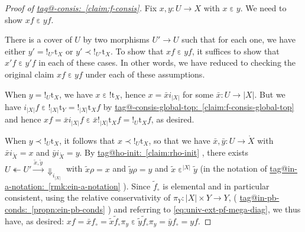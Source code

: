 \documentclass{amsart}
\makeatletter
\newcommand\abs[2][]{#1\lvert{#2}#1\rvert}
\newcommand\Dwn{{\Downarrow}}
\newcommand\ein{\mathrel{\varepsilon}}
\newcommand\oot{\twoheadleftarrow}
\newcommand\oring[1]{\mathring{#1}}
\newcommand\rt{\mathrm{t}}
\newcommand\tox[2][]{\xrightarrow[#1]{#2}}
\newcommand\unex{{!}}
\newcommand\tagword[1]{\csname tag@#1\endcsname}
\def\label@tag#1:#2\@nil{#1}
\newcommand\labeltag[1]{\label@tag#1:\@nil}
\newcommand\jref[1]{%
  \texorpdfstring%
    {\hyperref[#1]{\tagword{\labeltag{#1}}~\ref*{#1}}}%
    {\tagword{\labeltag{#1}}~\ref*{#1}}%
}
\theoremstyle{definition}
\theoremstyle{remark}
\theoremstyle{plainwithref}
\makeatother
\begin{document}
\begin{proof}[Proof of \jref{claim:f-consis}] \label{proof:f-consis}
  Fix \( x,y \colon U \to X \) with \( x \ein y \).
  We need to show \( x f \ein y f \).

  There is a cover of \( U \) by two morphisms \( U' \to U \) such that for each one, we have either \( y' = \unex_{U'} \rt_X \) or \( y' \prec \unex_{U'} \rt_X \).
  To show that \( x f \ein y f \), it suffices to show that \( x' f \ein y' f \) in each of these cases.
  In other words, we have reduced to checking the original claim \( x f \ein y f \) under each of these assumptions.

  When \( y = \unex_U \rt_X \), we have \( x \ein \unex \rt_X \), hence \( x = \bar x i_{\abs X} \) for some \( \bar x \colon U \to \abs X \).
  But we have \( i_{\abs X} f \ein \unex_{\abs X} \rt_Y = \unex_{\abs X} \rt_X f \) by \jref{claim:f-consis-global-top} and hence \( x f = \bar x i_{\abs X} f \ein \bar x \unex_{\abs X} \rt_X f = \unex_U \rt_X f \), as desired.

  When \( y \prec \unex_U \rt_X \), it follows that \( x \prec \unex_U \rt_X \), so that we have \( \bar x,\bar y \colon U \to \oring X \) with \( \bar x i_{\oring X} = x \) and \( \bar y i_{\oring X} = y \).
  By \jref{claim:rho-init}, there exists \( U \oot U' \tox{\tilde x, \tilde y} \Dwn_{i_{\abs X}} \) with \( \tilde x \rho = x \) and \( \tilde y \rho = y \) and \( \tilde x \ein^{\abs X} \tilde y \) (in the notation of \jref{rmk:ein-a-notation}).
  Since \( \tilde f_\circ \) is elemental and in particular consistent, using the relative conservativity of \( \pi_Y \colon \abs{X} \times Y \to Y \), (\jref{propn:ein-pb-conds}) and referring to \eqref{eq:univ-ext-pf-mega-diag}, we thus have, as desired:
  \(
  x f
  = \bar x f_\circ
  = \tilde x \tilde f_\circ \pi_y
  \ein \tilde y \tilde f_\circ \pi_y
  = \bar y f_\circ
  = y f.
  \)
\end{proof}
\end{document}
